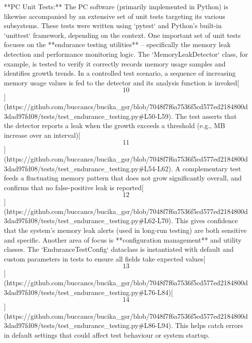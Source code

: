 \documentclass[12pt,a4paper]{article}
\begin{document}
{**PC Unit Tests:** The PC software (primarily implemented in Python) is
likewise accompanied by an extensive set of unit tests targeting its
various subsystems. These tests were written using `pytest` and Python's
built-in `unittest` framework, depending on the context. One important
set of unit tests focuses on the **endurance testing utilities** --
specifically the memory leak detection and performance monitoring logic.
The `MemoryLeakDetector` class, for example, is tested to verify it
correctly records memory usage samples and identifies growth trends. In
a controlled test scenario, a sequence of increasing memory usage values
is fed to the detector and its analysis function is
invoked[\[10\]](https://github.com/buccancs/bucika_gsr/blob/7048f7f6a7536f5cd577ed2184800d3dad97fd08/tests/test_endurance_testing.py#L50-L59).
The test asserts that the detector reports a leak when the growth
exceeds a threshold (e.g.,  MB increase over an
interval)[\[11\]](https://github.com/buccancs/bucika_gsr/blob/7048f7f6a7536f5cd577ed2184800d3dad97fd08/tests/test_endurance_testing.py#L54-L62).
A complementary test feeds a fluctuating memory pattern that does not
grow significantly overall, and confirms that no false-positive leak is
reported[\[12\]](https://github.com/buccancs/bucika_gsr/blob/7048f7f6a7536f5cd577ed2184800d3dad97fd08/tests/test_endurance_testing.py#L62-L70).
This gives confidence that the system's memory leak alerts (used in
long-run testing) are both sensitive and specific. Another area of focus
is **configuration management** and utility classes. The
`EnduranceTestConfig` dataclass is instantiated with default and custom
parameters in tests to ensure all fields take expected
values[\[13\]](https://github.com/buccancs/bucika_gsr/blob/7048f7f6a7536f5cd577ed2184800d3dad97fd08/tests/test_endurance_testing.py#L76-L84)[\[14\]](https://github.com/buccancs/bucika_gsr/blob/7048f7f6a7536f5cd577ed2184800d3dad97fd08/tests/test_endurance_testing.py#L86-L94).
This helps catch errors in default settings that could affect test
behaviour or system startup.

}
\end{document}
